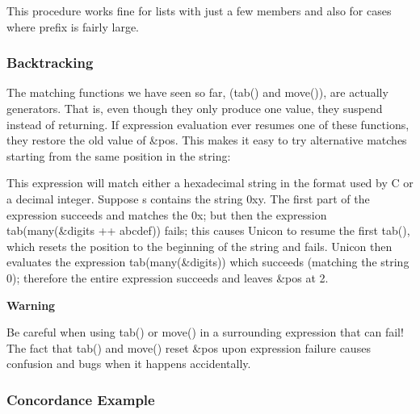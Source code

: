 
This procedure works fine for lists with just a few members and also for
cases where \textsf{prefix} is fairly large.

\subsubsection[Backtracking]{Backtracking}
The matching functions we have seen so far,
(\textsf{tab()} and \textsf{move()}), are actually
generators. That is, even though they only produce one
value, they suspend instead of returning. If expression evaluation ever
resumes one of these functions, they restore the old value of
\textsf{\&pos}. This makes it easy to try alternative matches starting
from the same position in the string:


This expression will match either a hexadecimal string in the format
used by C or a decimal integer. Suppose \textsf{s} contains the string
\textsf{{\textquotedbl}0xy{\textquotedbl}}. The first part of the
expression succeeds and matches the
\textsf{{\textquotedbl}0x{\textquotedbl}}; but then the expression
\textsf{tab(many(\&digits ++
{\textquotesingle}abcdef{\textquotesingle}))} fails; this causes Unicon
to resume the first \textsf{tab()}, which resets the position to the
beginning of the string and fails. Unicon then evaluates the expression
\textsf{tab(many(\&digits))} which succeeds (matching the string
\textsf{{\textquotedbl}0{\textquotedbl}}); therefore the entire
expression succeeds and leaves \textsf{\&pos} at 2.

{\sffamily\bfseries
Warning}

{\sffamily
Be careful when using tab() or move() in a surrounding expression that
can fail! The fact that tab() and move() reset \&pos upon expression
failure causes confusion and bugs when it happens accidentally.}

\subsubsection{Concordance Example}

